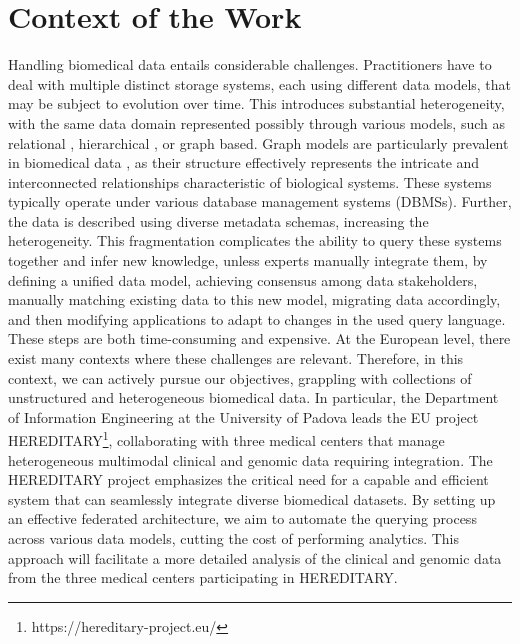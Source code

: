 
\chapter{Context of the Work}
\label{chp:context}
Handling biomedical data entails considerable challenges. Practitioners have to deal with multiple distinct storage systems, each using different data models, that may be subject to evolution over time. This introduces substantial heterogeneity, with the same data domain represented possibly through various models, such as relational \cite{DBLP:journals/nar/HardingAFSADPSD22}, hierarchical \cite{DBLP:journals/nar/WishartKGSHSCW06}, or graph based. Graph models are particularly prevalent in biomedical data \cite{DBLP:journals/nar/PineroBQGDCGSF17} \cite{DBLP:journals/nar/GillespieJSMRSG22}, as their structure effectively represents the intricate and interconnected relationships characteristic of biological systems.
These systems typically operate under various database management systems (DBMSs). Further, the data is described using diverse metadata schemas, increasing the heterogeneity. This fragmentation complicates the ability to query these systems together and infer new knowledge, unless experts manually integrate them, by defining a unified data model, achieving consensus among data stakeholders, manually matching existing data to this new model, migrating data accordingly, and then modifying applications to adapt to changes in the used query language. These steps are both time-consuming and expensive.
At the European level, there exist many contexts where these challenges are relevant. Therefore, in this context, we can actively pursue our objectives, grappling with collections of unstructured and heterogeneous biomedical data. In particular, the Department of Information Engineering at the University of Padova leads the EU project HEREDITARY\footnote{https://hereditary-project.eu/}, collaborating with three medical centers that manage heterogeneous multimodal clinical and genomic data requiring integration. The \ac{HEREDITARY} project emphasizes the critical need for a capable and efficient system that can seamlessly integrate diverse biomedical datasets. By setting up an effective federated architecture, we aim to automate the querying process across various data models, cutting the cost of performing analytics. This approach will facilitate a more detailed analysis of the clinical and genomic data from the three medical centers participating in \ac{HEREDITARY}.

